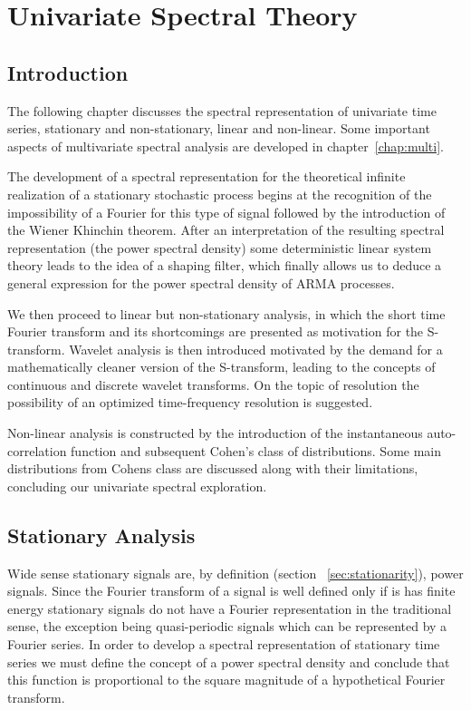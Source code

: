 \chapter{Univariate Spectral Theory}

\section*{Introduction}

The following chapter discusses the spectral representation of univariate time
series, stationary and non-stationary, linear and non-linear. Some important
aspects of multivariate spectral analysis are developed in
chapter~\ref{chap:multi}.

The development of a spectral representation for the theoretical infinite
realization of a stationary stochastic process begins at the recognition of the
impossibility of a Fourier for this type of signal followed by the introduction
of the Wiener Khinchin theorem. After an interpretation of the resulting
spectral representation (the power spectral density) some deterministic linear
system theory leads to the idea of a shaping filter, which finally allows us to
deduce a general expression for the power spectral density of ARMA processes.

We then proceed to linear but non-stationary analysis, in which the short time
Fourier transform and its shortcomings are presented as motivation for the
S-transform. Wavelet analysis is then introduced motivated by the demand for a
mathematically cleaner version of the S-transform, leading to the concepts of
continuous and discrete wavelet transforms. On the topic of resolution the
possibility of an optimized time-frequency resolution is suggested.

Non-linear analysis is constructed by the introduction of the instantaneous
auto-correlation function and subsequent Cohen's class of distributions. Some
main distributions from Cohens class are discussed along with their
limitations, concluding our univariate spectral exploration.

\section{Stationary Analysis}

Wide sense stationary signals are, by definition (section
~\ref{sec:stationarity}), power signals. Since the Fourier transform of a
signal is well defined only if is has finite energy stationary signals do not
have a Fourier representation in the traditional sense, the exception being
quasi-periodic signals which can be represented by a Fourier series. In order
to develop a spectral representation of stationary time series we must define
the concept of a power spectral density and conclude that this function is
proportional to the square magnitude of a hypothetical Fourier transform.

